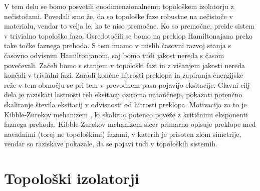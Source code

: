 V tem delu se bomo posvetili enodimenzionalnemu topološkem izolatorju z nečistočami. Povedali smo že, da so topološke faze robustne na nečistoče v materialu, vendar to velja le, ko te niso premočne. Ko so premočne, preide sistem v trivialno topološko fazo.
Osredotočili se bomo na preklop Hamiltonajana preko take točke faznega prehoda. S tem imamo v mislih časovni razvoj stanja s časovno odvisnim Hamiltonjanom, saj bomo tudi jakost nereda s časom povečevali. Začeli bomo s stanjem v topološki fazi in z višanjem jakosti nereda končali v trivialni fazi. Zaradi končne hitrosti preklopa in zapiranja energijske reže v tem območju se pri tem v prevodnem pasu pojavijo eksitacije. Glavni cilj dela je raziskati lastnosti teh eksitacij oziroma natančneje, pokazati potenčno skaliranje števila eksitacij v odvisnosti od hitrosti preklopa. Motivacija za to je Kibble-Zurekov mehanizem \cite{kibble}, ki skalirno potenco poveže z kritičnimi eksponenti faznega prehoda. Kibble-Zurekov mehanizem sicer primarno opisuje preklope med navadnimi (torej ne topološkimi) fazami, v katerih je prisoten zlom simetrije, vendar so raziskave  \cite{uvod1, uvod2, lara1,lara2,uvod3,lara3,uvod4} pokazale, da se pojavi tudi v topoloških sistemih.
\chapter{Topološki izolatorji}
\label{chMa}

